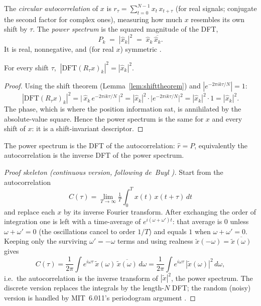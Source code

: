 \begin{definition}
\label{def:powerspec}
The \emph{circular autocorrelation} of $x$ is $r_\tau = \sum_{t=0}^{N-1} x_t\,
x_{t+\tau}$ (for real signals; conjugate the second factor for complex ones), measuring
how much $x$ resembles its own shift by $\tau$. The \emph{power spectrum} is the squared
magnitude of the DFT,
\[
  P_k \;=\; |\widehat x_k|^2 \;=\; \widehat x_k\,\overline{\widehat x_k}.
\]
It is real, nonnegative, and (for real $x$) symmetric \citep{invariants_mit6011}.
\end{definition}

\begin{theorem}
\label{thm:psinv}
For every shift $\tau$, $\ |\mathrm{DFT}(R_\tau x)_k|^2 = |\widehat x_k|^2$.
\end{theorem}

\begin{proof}
Using the shift theorem (Lemma~\ref{lem:shifttheorem}) and $|e^{-2\pi i k\tau/N}| = 1$:
\[
  |\mathrm{DFT}(R_\tau x)_k|^2
    = \bigl|\,\widehat x_k\, e^{-2\pi i k\tau/N}\,\bigr|^2
    = |\widehat x_k|^2 \cdot \bigl|e^{-2\pi i k\tau/N}\bigr|^2
    = |\widehat x_k|^2 \cdot 1
    = |\widehat x_k|^2 .
\]
The phase, which is where the position information sat, is annihilated by the
absolute-value square. Hence the power spectrum is the same for $x$ and every shift of
$x$: it is a shift-invariant descriptor.
\end{proof}

\begin{theorem}[Wiener--Khinchin: power spectrum $=$ transform of autocorrelation]
\label{thm:wk}
The power spectrum is the DFT of the autocorrelation: $\widehat r = P$, equivalently the
autocorrelation is the inverse DFT of the power spectrum.
\end{theorem}

\begin{proof}[Proof skeleton (continuous version, following de~Buyl
\citep{invariants_wienerkhinchin})]
Start from the autocorrelation
\[
  C(\tau) = \lim_{T\to\infty} \tfrac1T \int_0^T x(t)\, x(t+\tau)\,dt
\]
and replace each $x$ by its inverse Fourier transform. After exchanging
the order of integration one is left with a time-average of $e^{i(\omega+\omega')t}$:
that average is $0$ unless $\omega + \omega' = 0$ (the oscillations cancel to order
$1/T$) and equals $1$ when $\omega + \omega' = 0$. Keeping only the surviving
$\omega' = -\omega$ terms and using realness $\widetilde x(-\omega) =
\overline{\widetilde x(\omega)}$ gives
\[
  C(\tau) = \frac{1}{2\pi}\int e^{i\omega\tau}\,\widetilde x(\omega)\,
            \overline{\widetilde x(\omega)}\,d\omega
          = \frac{1}{2\pi}\int e^{i\omega\tau}\,|\widetilde x(\omega)|^2\,d\omega,
\]
i.e.\ the autocorrelation is the inverse transform of $|\widetilde x|^2$, the power
spectrum. The discrete version replaces the integrals by the length-$N$ DFT; the random
(noisy) version is handled by MIT~6.011's periodogram argument
\citep{invariants_mit6011}.
\end{proof}


